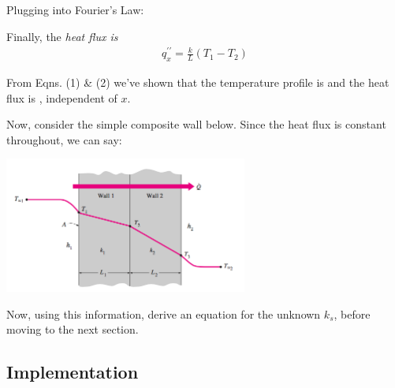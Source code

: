 \documentclass[11pt, letterpaper]{article}
\begin{document}
Plugging into Fourier's Law:


Finally, the \it{heat flux} is
\begin{align}
    q_x^{\prime\prime} = \frac{k}{L} (T_1 - T_2)
\end{align}

From Eqns. (1) \& (2) we've shown that the temperature profile is  and the heat flux is , independent of $x$. 

\n
Now, consider the simple composite wall below. Since the heat flux is constant throughout, we can say:






\begin{minipage}[c]{0.50\textwidth}
{\small
\begin{center}
\begin{tcolorbox}[enhanced, width=5cm, top=-4mm, colback=red!5, colframe=black!50!white, boxrule=0.5pt, boxsep=1.5mm, bottom=1mm]
\end{tcolorbox}
\end{center}
}
\end{minipage}  \hfill
\begin{minipage}[c]{0.50\linewidth}
\hspace{-5mm}
\vspace{-2ex}
    \includegraphics[width=80mm]{gfx/fig5.png}\label{fig5}
\vspace{2pt}
\end{minipage}

Now, using this information, derive an equation for the unknown $k_s$, before moving to the next section.

\subsection{Implementation}
\end{document}
